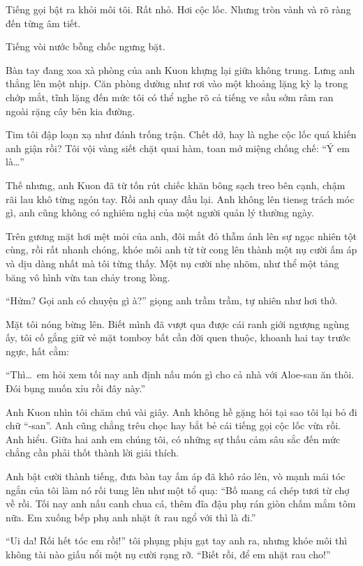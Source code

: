 ﻿\documentclass[../main.tex]{subfiles}
\begin{document}
Tiếng gọi bật ra khỏi môi tôi. Rất nhỏ. Hơi cộc lốc. Nhưng tròn vành và rõ ràng đến từng âm tiết.

Tiếng vòi nước bỗng chốc ngưng bặt.

Bàn tay đang xoa xà phòng của anh Kuon khựng lại giữa không trung. Lưng anh thẳng lên một nhịp. Căn phòng dường như rơi vào một khoảng lặng kỳ lạ trong chớp mắt, tĩnh lặng đến mức tôi có thể nghe rõ cả tiếng ve sầu sớm râm ran ngoài rặng cây bên kia đường.

Tim tôi đập loạn xạ như đánh trống trận. Chết dở, hay là nghe cộc lốc quá khiến anh giận rồi? Tôi vội vàng siết chặt quai hàm, toan mở miệng chống chế: ``Ý em là\dots''

Thế nhưng, anh Kuon đã từ tốn rút chiếc khăn bông sạch treo bên cạnh, chậm rãi lau khô từng ngón tay. Rồi anh quay đầu lại. Anh không lên tiensg trách móc gì, anh cũng không có nghiêm nghị của một người quản lý thường ngày.

Trên gương mặt hơi mệt mỏi của anh, đôi mắt đỏ thẫm ánh lên sự ngạc nhiên tột cùng, rồi rất nhanh chóng, khóe môi anh từ từ cong lên thành một nụ cười ấm áp và dịu dàng nhất mà tôi từng thấy. Một nụ cười nhẹ nhõm, như thể một tảng băng vô hình vừa tan chảy trong lòng.

``Hửm? Gọi anh có chuyện gì à?'' giọng anh trầm trầm, tự nhiên như hơi thở.

Mặt tôi nóng bừng lên. Biết mình đã vượt qua được cái ranh giới ngượng ngùng ấy, tôi cố gắng giữ vẻ mặt tomboy bất cần đời quen thuộc, khoanh hai tay trước ngực, hất cằm:

``Thì\dots\ em hỏi xem tối nay anh định nấu món gì cho cả nhà với Aloe-san ăn thôi. Đói bụng muốn xỉu rồi đây này.''

Anh Kuon nhìn tôi chăm chú vài giây. Anh không hề gặng hỏi tại sao tôi lại bỏ đi chữ ``-san''. Anh cũng chẳng trêu chọc hay bắt bẻ cái tiếng gọi cộc lốc vừa rồi. Anh hiểu. Giữa hai anh em chúng tôi, có những sự thấu cảm sâu sắc đến mức chẳng cần phải thốt thành lời giải thích.

Anh bật cười thành tiếng, đưa bàn tay ấm áp đã khô ráo lên, vò mạnh mái tóc ngắn của tôi làm nó rối tung lên như một tổ quạ: ``Bố mang cá chép tươi từ chợ về rồi. Tối nay anh nấu canh chua cá, thêm đĩa đậu phụ rán giòn chấm mắm tôm nữa. Em xuống bếp phụ anh nhặt ít rau ngổ với thì là đi.''

``Ui da! Rối hết tóc em rồi!'' tôi phụng phịu gạt tay anh ra, nhưng khóe môi thì không tài nào giấu nổi một nụ cười rạng rỡ. ``Biết rồi, để em nhặt rau cho!''
\end{document}
